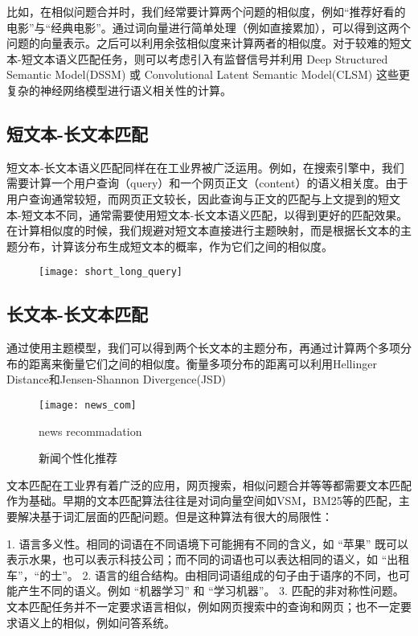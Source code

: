 比如，在相似问题合并时，我们经常要计算两个问题的相似度，例如“推荐好看的电影”与“经典电影”。通过词向量进行简单处理（例如直接累加），可以得到这两个问题的向量表示。之后可以利用余弦相似度来计算两者的相似度。对于较难的短文本-短文本语义匹配任务，则可以考虑引入有监督信号并利用 Deep Structured Semantic Model(DSSM)\citep{Huang2013LearningDS} 或 Convolutional Latent Semantic Model(CLSM)\citep{Shen2014ALS} 这些更复杂的神经网络模型进行语义相关性的计算。

\subsection{短文本-长文本匹配}
短文本-长文本语义匹配同样在在工业界被广泛运用。例如，在搜索引擎中，我们需要计算一个用户查询（query）和一个网页正文（content）的语义相关度。由于用户查询通常较短，而网页正文较长，因此查询与正文的匹配与上文提到的短文本-短文本不同，通常需要使用短文本-长文本语义匹配，以得到更好的匹配效果。在计算相似度的时候，我们规避对短文本直接进行主题映射，而是根据长文本的主题分布，计算该分布生成短文本的概率，作为它们之间的相似度。

\begin{figure}[!htbp]
    \centering
    \texttt{[image: short\_long\_query]}
    \label{fig:user-ad-match}
\end{figure}

\subsection{长文本-长文本匹配}
通过使用主题模型，我们可以得到两个长文本的主题分布，再通过计算两个多项分布的距离来衡量它们之间的相似度。衡量多项分布的距离可以利用Hellinger Distance\citep{website:Hellinger}和Jensen-Shannon Divergence(JSD)\citep{website:Shannondivergence}

\begin{figure}[!htbp]
  \centering
  \texttt{[image: news\_com]}
  \caption{新闻个性化推荐}{news recommadation}
  \label{fig:news_recom}
\end{figure}

文本匹配在工业界有着广泛的应用，网页搜索，相似问题合并等等都需要文本匹配作为基础。早期的文本匹配算法往往是对词向量空间如VSM，BM25等的匹配，主要解决基于词汇层面的匹配问题。但是这种算法有很大的局限性：

1. 语言多义性。相同的词语在不同语境下可能拥有不同的含义，如 “苹果” 既可以表示水果，也可以表示科技公司；而不同的词语也可以表达相同的语义，如 “出租车”，“的士”。
2. 语言的组合结构。由相同词语组成的句子由于语序的不同，也可能产生不同的语义。例如 “机器学习” 和 “学习机器”。
3. 匹配的非对称性问题。文本匹配任务并不一定要求语言相似，例如网页搜索中的查询和网页；也不一定要求语义上的相似，例如问答系统。


